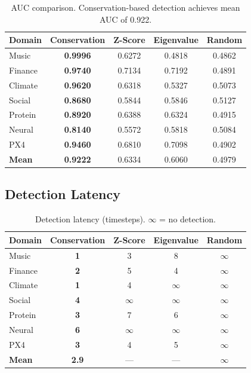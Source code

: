 \documentclass[11pt,a4paper]{article}
\begin{document}
\begin{table}[ht]
\centering
\caption{AUC comparison.  Conservation-based detection achieves mean AUC of 0.922.}
\label{tab:auc}
\begin{tabular}{@{}lcccc@{}}
\toprule
\textbf{Domain} & \textbf{Conservation} & \textbf{Z-Score} & \textbf{Eigenvalue} & \textbf{Random} \\
\midrule
Music       & \textbf{0.9996} & 0.6272 & 0.4818 & 0.4862 \\
Finance     & \textbf{0.9740} & 0.7134 & 0.7192 & 0.4891 \\
Climate     & \textbf{0.9620} & 0.6318 & 0.5327 & 0.5073 \\
Social      & \textbf{0.8680} & 0.5844 & 0.5846 & 0.5127 \\
Protein     & \textbf{0.8920} & 0.6388 & 0.6324 & 0.4915 \\
Neural      & \textbf{0.8140} & 0.5572 & 0.5818 & 0.5084 \\
PX4         & \textbf{0.9460} & 0.6810 & 0.7098 & 0.4902 \\
\midrule
\textbf{Mean} & \textbf{0.9222} & 0.6334 & 0.6060 & 0.4979 \\
\bottomrule
\end{tabular}
\end{table}

\subsection{Detection Latency}

\begin{table}[ht]
\centering
\caption{Detection latency (timesteps).  $\infty$ = no detection.}
\begin{tabular}{@{}lcccc@{}}
\toprule
\textbf{Domain} & \textbf{Conservation} & \textbf{Z-Score} & \textbf{Eigenvalue} & \textbf{Random} \\
\midrule
Music       & \textbf{1} & 3 & 8 & $\infty$ \\
Finance     & \textbf{2} & 5 & 4 & $\infty$ \\
Climate     & \textbf{1} & 4 & $\infty$ & $\infty$ \\
Social      & \textbf{4} & $\infty$ & $\infty$ & $\infty$ \\
Protein     & \textbf{3} & 7 & 6 & $\infty$ \\
Neural      & \textbf{6} & $\infty$ & $\infty$ & $\infty$ \\
PX4         & \textbf{3} & 4 & 5 & $\infty$ \\
\midrule
\textbf{Mean} & \textbf{2.9} & --- & --- & $\infty$ \\
\bottomrule
\end{tabular}
\end{table}
\end{document}
